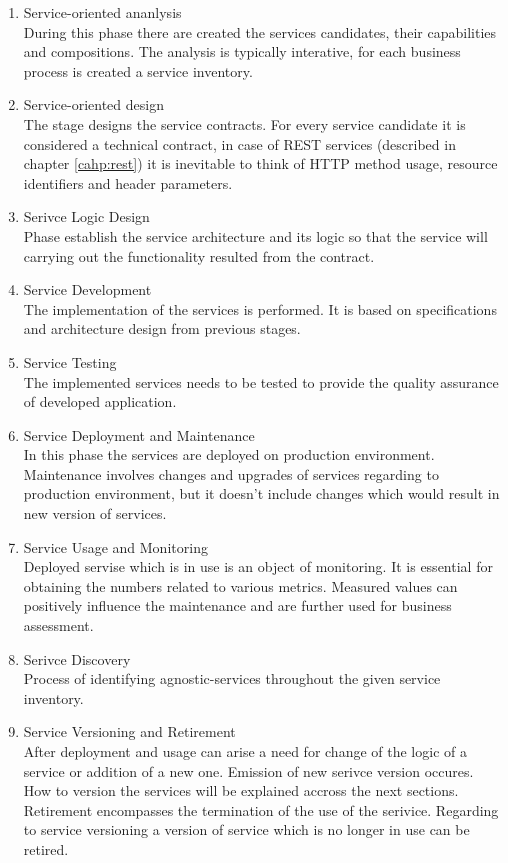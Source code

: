 \begin{enumerate}
  \item Service-oriented ananlysis \\
  During this phase there are created the services candidates, their capabilities and compositions. The analysis is typically interative, for each business process is created a service inventory.
  \item Service-oriented design \\
  The stage designs the service contracts. For every service candidate it is considered a technical contract, in case of REST services (described in chapter \ref{cahp:rest}) it is inevitable to think of HTTP method usage, resource identifiers and header parameters.
  \item Serivce Logic Design \\
  Phase establish the service architecture and its logic so that the service will carrying out the functionality resulted from the contract.
  \item Service Development \\
  The implementation of the services is performed. It is based on specifications and architecture design from previous stages.
  \item Service Testing \\
  The implemented services needs to be tested to provide the quality assurance of developed application.
  \item Service Deployment and Maintenance \\
  In this phase the services are deployed on production environment. Maintenance involves changes and upgrades of services regarding to production environment, but it doesn't include changes which would result in new version of services.
  \item Service Usage and Monitoring \\
  Deployed servise which is in use is an object of monitoring. It is essential for obtaining the numbers related to various metrics. Measured values can positively influence the maintenance and are further used for business assessment.
  \item Serivce Discovery \\
  Process of identifying \gls{agnostic-services} throughout the given service inventory.
  \item Service Versioning and Retirement \\
  After deployment and usage can arise a need for change of the logic of a service or addition of a new one. Emission of new serivce version occures. How to version the services will be explained accross the next sections. Retirement encompasses the termination of the use of the serivice. Regarding to service versioning a version of service which is no longer in use can be retired.
\end{enumerate}

